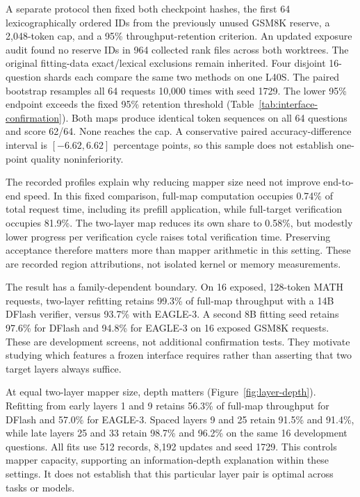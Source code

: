 \documentclass{article}
\begin{document}
A separate protocol then fixed both checkpoint hashes, the first 64
lexicographically ordered IDs from the previously unused GSM8K reserve,
a 2,048-token cap, and a 95\% throughput-retention criterion. An updated
exposure audit found no reserve IDs in 964 collected rank files across
both worktrees. The original fitting-data exact/lexical exclusions remain
inherited. Four disjoint 16-question shards each compare the same two
methods on one L40S. The paired bootstrap resamples all 64 requests
10,000 times with seed 1729. The lower 95\% endpoint exceeds the fixed
95\% retention threshold (Table~\ref{tab:interface-confirmation}).
Both maps produce identical token sequences on all 64 questions and
score 62/64. None reaches the cap. A conservative paired accuracy-difference
interval is $[-6.62,6.62]$ percentage points, so this sample does not
establish one-point quality noninferiority.

\begin{table}[H]
\centering\small

\caption{Fixed DFlash-8B interface comparison on 64 fresh GSM8K requests.
Parameter counts concern the mapper. Throughput includes request overhead.
Intervals resample requests and do not include fitting-seed variation.}
\label{tab:interface-confirmation}
\end{table}

The recorded profiles explain why reducing mapper size need not improve
end-to-end speed. In this fixed comparison, full-map computation occupies
0.74\% of total request time, including its prefill application, while
full-target verification occupies 81.9\%. The two-layer map reduces its
own share to 0.58\%, but modestly lower progress per verification cycle
raises total verification time. Preserving acceptance therefore matters
more than mapper arithmetic in this setting. These are recorded region
attributions, not isolated kernel or memory measurements.

The result has a family-dependent boundary. On 16 exposed, 128-token
MATH requests, two-layer refitting retains 99.3\% of full-map throughput
with a 14B DFlash verifier, versus 93.7\% with EAGLE-3. A second 8B
fitting seed retains 97.6\% for DFlash and 94.8\% for EAGLE-3 on 16
exposed GSM8K requests. These are development screens, not additional
confirmation tests. They motivate studying which features a frozen
interface requires rather than asserting that two target layers always
suffice.

At equal two-layer mapper size, depth matters (Figure~\ref{fig:layer-depth}).
Refitting from early layers 1 and 9 retains 56.3\% of full-map throughput
for DFlash and 57.0\% for EAGLE-3. Spaced layers 9 and 25 retain
91.5\% and 91.4\%, while late layers 25 and 33 retain 98.7\% and
96.2\% on the same 16 development questions. All fits use 512 records,
8,192 updates and seed 1729. This controls mapper capacity, supporting
an information-depth explanation within these settings. It does not
establish that this particular layer pair is optimal across tasks or models.
\end{document}
